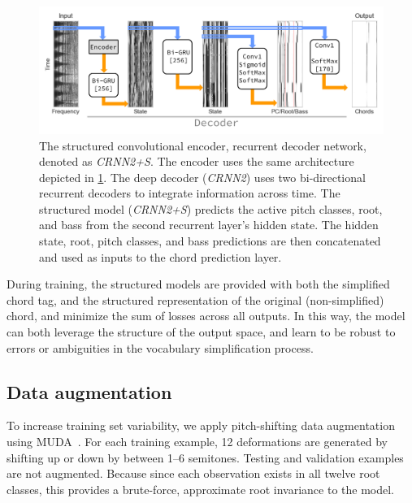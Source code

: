 \documentclass{article}
\begin{document}
\begin{figure}
    \centering
    \includegraphics[width=\columnwidth]{crnn2}
    \caption{The structured convolutional encoder, recurrent decoder network, denoted as \emph{CRNN2+S}.
    The encoder uses the same architecture depicted in \cref{fig:crnn2}.
    The deep decoder (\emph{CRNN2}) uses two bi-directional recurrent decoders to integrate information across time.
    The structured model (\emph{CRNN2+S}) predicts the active pitch classes, root, and bass from the second recurrent layer's hidden state.
    The hidden state, root, pitch classes, and bass predictions are then concatenated and used as inputs to the chord prediction layer.\label{fig:crnn2}}
\end{figure}


During training, the structured models are provided with both the simplified chord tag, and the structured representation of the original (non-simplified) chord, and minimize the sum of losses across all outputs.
In this way, the model can both leverage the structure of the output space, and learn to be robust to errors or ambiguities in the vocabulary simplification process.


\subsection{Data augmentation}

To increase training set variability, we apply pitch-shifting data augmentation using MUDA~\cite{mcfee2015software}.
For each training example, 12 deformations are generated by shifting up or down by between 1--6 semitones.
Testing and validation examples are not augmented.
Because since each observation exists in all twelve root classes, this provides a brute-force, approximate root invariance to the model.
\end{document}
